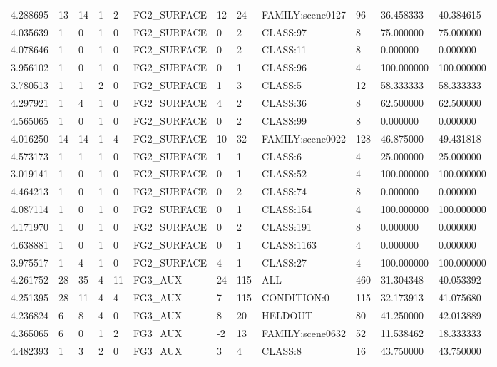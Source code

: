 \begin{tabular}{llllllllllll}
4.288695 & 13 & 14 & 1 & 2 & FG2\_SURFACE & 12 & 24 & FAMILY:scene0127 & 96 & 36.458333 & 40.384615 \\
4.035639 & 1 & 0 & 1 & 0 & FG2\_SURFACE & 0 & 2 & CLASS:97 & 8 & 75.000000 & 75.000000 \\
4.078646 & 1 & 0 & 1 & 0 & FG2\_SURFACE & 0 & 2 & CLASS:11 & 8 & 0.000000 & 0.000000 \\
3.956102 & 1 & 0 & 1 & 0 & FG2\_SURFACE & 0 & 1 & CLASS:96 & 4 & 100.000000 & 100.000000 \\
3.780513 & 1 & 1 & 2 & 0 & FG2\_SURFACE & 1 & 3 & CLASS:5 & 12 & 58.333333 & 58.333333 \\
4.297921 & 1 & 4 & 1 & 0 & FG2\_SURFACE & 4 & 2 & CLASS:36 & 8 & 62.500000 & 62.500000 \\
4.565065 & 1 & 0 & 1 & 0 & FG2\_SURFACE & 0 & 2 & CLASS:99 & 8 & 0.000000 & 0.000000 \\
4.016250 & 14 & 14 & 1 & 4 & FG2\_SURFACE & 10 & 32 & FAMILY:scene0022 & 128 & 46.875000 & 49.431818 \\
4.573173 & 1 & 1 & 1 & 0 & FG2\_SURFACE & 1 & 1 & CLASS:6 & 4 & 25.000000 & 25.000000 \\
3.019141 & 1 & 0 & 1 & 0 & FG2\_SURFACE & 0 & 1 & CLASS:52 & 4 & 100.000000 & 100.000000 \\
4.464213 & 1 & 0 & 1 & 0 & FG2\_SURFACE & 0 & 2 & CLASS:74 & 8 & 0.000000 & 0.000000 \\
4.087114 & 1 & 0 & 1 & 0 & FG2\_SURFACE & 0 & 1 & CLASS:154 & 4 & 100.000000 & 100.000000 \\
4.171970 & 1 & 0 & 1 & 0 & FG2\_SURFACE & 0 & 2 & CLASS:191 & 8 & 0.000000 & 0.000000 \\
4.638881 & 1 & 0 & 1 & 0 & FG2\_SURFACE & 0 & 1 & CLASS:1163 & 4 & 0.000000 & 0.000000 \\
3.975517 & 1 & 4 & 1 & 0 & FG2\_SURFACE & 4 & 1 & CLASS:27 & 4 & 100.000000 & 100.000000 \\
4.261752 & 28 & 35 & 4 & 11 & FG3\_AUX & 24 & 115 & ALL & 460 & 31.304348 & 40.053392 \\
4.251395 & 28 & 11 & 4 & 4 & FG3\_AUX & 7 & 115 & CONDITION:0 & 115 & 32.173913 & 41.075680 \\
4.236824 & 6 & 8 & 4 & 0 & FG3\_AUX & 8 & 20 & HELDOUT & 80 & 41.250000 & 42.013889 \\
4.365065 & 6 & 0 & 1 & 2 & FG3\_AUX & -2 & 13 & FAMILY:scene0632 & 52 & 11.538462 & 18.333333 \\
4.482393 & 1 & 3 & 2 & 0 & FG3\_AUX & 3 & 4 & CLASS:8 & 16 & 43.750000 & 43.750000 \\

\end{tabular}
